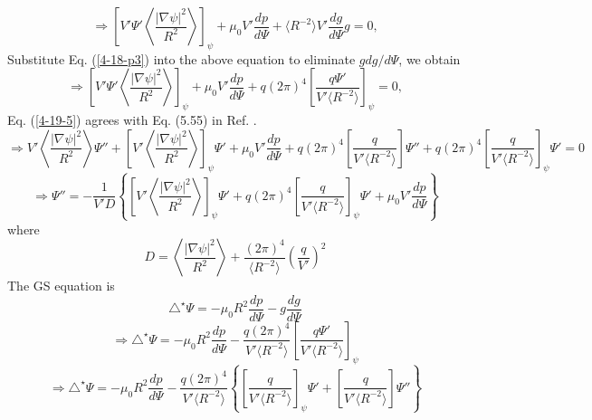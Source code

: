 \documentclass{llncs}
\begin{document}
\begin{equation}
  \Rightarrow \left[ V' \Psi' \left\langle \frac{| \nabla \psi |^2}{R^2}
  \right\rangle \right]_{\psi} + \mu_0 V' \frac{d p}{d \Psi} + \langle R^{- 2}
  \rangle V' \frac{d g}{d \Psi} g = 0,
\end{equation}
Substitute Eq. (\ref{4-18-p3}) into the above equation to eliminate $g d g / d
\Psi$, we obtain
\begin{equation}
  \label{4-19-5} \Rightarrow \left[ V' \Psi' \left\langle \frac{| \nabla \psi
  |^2}{R^2} \right\rangle \right]_{\psi} + \mu_0 V' \frac{d p}{d \Psi} + q (2
  \pi)^4 \left[ \frac{q \Psi'}{V' \langle R^{- 2} \rangle} \right]_{\psi} = 0,
\end{equation}
Eq. (\ref{4-19-5}) agrees with Eq. (5.55) in Ref. {\cite{jardin2010}}.
\begin{equation}
  \Rightarrow V' \left\langle \frac{| \nabla \psi |^2}{R^2} \right\rangle
  \Psi'' + \left[ V' \left\langle \frac{| \nabla \psi |^2}{R^2} \right\rangle
  \right]_{\psi} \Psi' + \mu_0 V' \frac{d p}{d \Psi} + q (2 \pi)^4 \left[
  \frac{q}{V' \langle R^{- 2} \rangle} \right] \Psi'' + q (2 \pi)^4 \left[
  \frac{q}{V' \langle R^{- 2} \rangle} \right]_{\psi} \Psi' = 0
\end{equation}
\begin{equation}
  \label{1-2-4} \Rightarrow \Psi'' = - \frac{1}{V' D} \left\{ \left[ V'
  \left\langle \frac{| \nabla \psi |^2}{R^2} \right\rangle \right]_{\psi}
  \Psi' + q (2 \pi)^4 \left[ \frac{q}{V' \langle R^{- 2} \rangle}
  \right]_{\psi} \Psi' + \mu_0 V' \frac{d p}{d \Psi} \right\}
\end{equation}
where
\begin{equation}
  D = \left\langle \frac{| \nabla \psi |^2}{R^2} \right\rangle + \frac{(2
  \pi)^4}{\langle R^{- 2} \rangle} \left( \frac{q}{V'} \right)^2
\end{equation}
The GS equation is
\begin{equation}
  \triangle^{\star} \Psi = - \mu_0 R^2 \frac{d p}{d \Psi} - g \frac{d g}{d
  \Psi}
\end{equation}
\begin{equation}
  \Rightarrow \triangle^{\star} \Psi = - \mu_0 R^2 \frac{d p}{d \Psi} -
  \frac{q (2 \pi)^4}{V' \langle R^{- 2} \rangle} \left[ \frac{q \Psi'}{V'
  \langle R^{- 2} \rangle} \right]_{\psi}
\end{equation}
\begin{equation}
  \Rightarrow \triangle^{\star} \Psi = - \mu_0 R^2 \frac{d p}{d \Psi} -
  \frac{q (2 \pi)^4}{V' \langle R^{- 2} \rangle} \left\{ \left[ \frac{q}{V'
  \langle R^{- 2} \rangle} \right]_{\psi} \Psi' + \left[ \frac{q}{V' \langle
  R^{- 2} \rangle} \right] \Psi'' \right\}
\end{equation}
\end{document}
